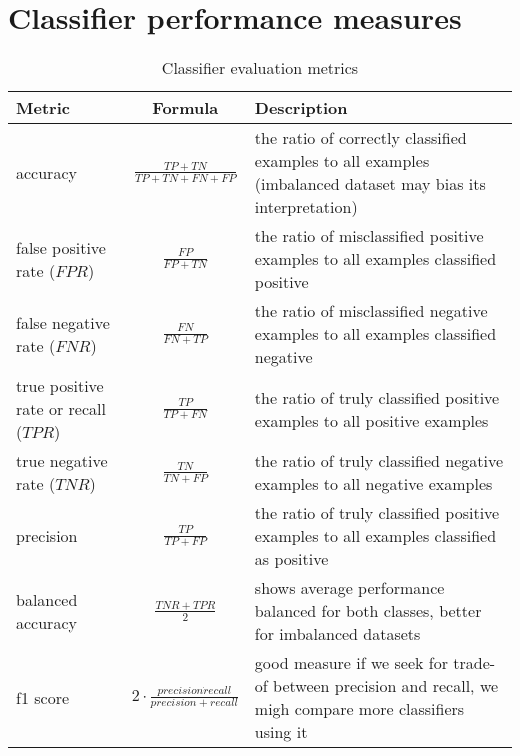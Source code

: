 \chapter{Classifier performance measures} \label{app:metrics}

\begin{table}[h]
    \centering
    \caption{Classifier evaluation metrics}
    \begin{minipage}{\linewidth}
    \begin{tabular}{lcp{5cm}}
      \toprule
      \textbf{Metric} &
      \textbf{Formula} &
      \textbf{Description}
      \\
      \midrule
      accuracy & $\frac{TP+TN}{TP+TN+FN+FP}$ & the ratio of correctly classified examples to all examples (imbalanced dataset may bias its interpretation)\\
      \midrule
      false positive rate ($FPR$) & $\frac{FP}{FP+TN}$ & the ratio of misclassified positive examples to all examples classified positive \\
      \midrule
      false negative rate ($FNR$) & $\frac{FN}{FN+TP}$ &  the ratio of misclassified negative examples to all examples classified negative \\
      \midrule
      true positive rate or recall ($TPR$) & $\frac{TP}{TP+FN}$ & the ratio of truly classified positive examples to all positive examples  \\
      \midrule
      true negative rate ($TNR$) & $\frac{TN}{TN+FP}$ & the ratio of truly classified negative examples to all negative examples \\
      \midrule
      precision & $\frac{TP}{TP+FP}$ & the ratio of truly classified positive examples to all examples classified as positive \\
      \midrule
      balanced accuracy &$\frac{TNR+TPR}{2}$ & shows average performance balanced for both classes, better for imbalanced datasets \\
      \midrule
      f1 score & $2 \cdot \frac{precision \dot recall}{precision+recall}$ & good measure if we seek for trade-of between precision and recall, we migh compare more classifiers using it\\
      \bottomrule
    \end{tabular}
    \end{minipage}
    \label{tab:metrics}
  \end{table}